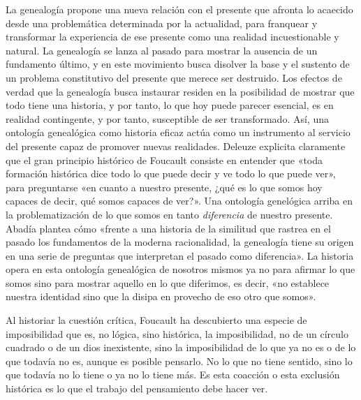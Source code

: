 La genealogía propone una nueva relación con el presente que afronta lo acaecido desde una problemática determinada por la actualidad, para franquear y transformar la experiencia de ese presente como una realidad incuestionable y natural. La genealogía se lanza al pasado para mostrar la ausencia de un fundamento último, y en este movimiento busca disolver la base y el sustento de un problema constitutivo del presente que merece ser destruido. Los efectos de verdad que la genealogía busca instaurar residen en la posibilidad de mostrar que todo tiene una historia, y por tanto, lo que hoy puede parecer esencial, es en realidad contingente, y por tanto, susceptible de ser transformado. Así, una ontología genealógica como historia eficaz actúa como un instrumento al servicio del presente capaz de promover nuevas realidades. Deleuze explicita claramente que el gran principio histórico de Foucault consiste en entender que «toda formación histórica dice todo lo que puede decir y ve todo lo que puede ver», para preguntarse «en cuanto a nuestro presente, ¿qué es lo que somos hoy capaces de decir, qué somos capaces de ver?». Una ontología genelógica arriba en la problematización de lo que somos en tanto \emph{diferencia} de nuestro presente. Abadía plantea cómo «frente a una historia de la similitud que rastrea en el pasado los fundamentos de la moderna racionalidad, la genealogía tiene su origen en una serie de preguntas que interpretan el pasado como diferencia». La historia opera en esta ontología genealógica de nosotros mismos ya no para afirmar lo que somos sino para mostrar aquello en lo que diferimos, es decir, «no establece nuestra identidad sino que la disipa en provecho de eso otro que somos».

Al historiar la cuestión crítica, Foucault ha descubierto una especie de imposibilidad que es, no lógica, sino histórica, la imposibilidad, no de un círculo cuadrado o de un dios inexistente, sino la imposibilidad de lo que ya no es o de lo que todavía no es, aunque es posible pensarlo. No lo que no tiene sentido, sino lo que todavía no lo tiene o ya no lo tiene más. Es esta coacción o esta exclusión histórica es lo que el trabajo del pensamiento debe hacer ver.


